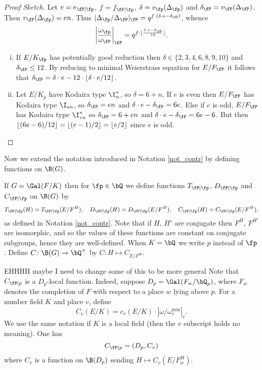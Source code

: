 \begin{proof}[Proof Sketch]
    Let $e = e_{\fP \mid \fp}$, $f = f_{\fP \mid \fp}$, $\delta = v_{\fp}(\Delta_{\fp})$ and $\delta_{\fP} = v_{\fP}(\Delta_{\fP})$. Then $v_{\fP}(\Delta_{\fp}) = e n$. Thus $|\Delta_{\fp} / \Delta_{\fP} |_{\fP} = q^{f\cdot (\delta \cdot e - \delta_{\fP})}$, whence $$\left| \frac{\omega_{\fp}}{\omega_{\fP}}\right|_{\fP} = q^{f \cdot \floor{\frac{\delta \cdot e - \delta_{\fP}}{12}}}.$$ 
    \begin{enumerate}[(i)]
        \setlength\itemsep{0em}
        \setcounter{enumi}{1}
        \item If $E / K_{\fp}$ has potentially good reduction then $\delta \in \{ 2,3,4,6,8,9,10 \}$ and $\delta_{\fP} \leq 12$. By reducing to minimal Weierstrass equation for $E / F_{\fP}$ it follows that $\delta_{\fP} = \delta\cdot e - 12 \cdot \floor{\delta\cdot e / 12}$.
        
        \item Let $E / K_p$ have Kodaira type $\I_n^*$, so $\delta = 6 + n$. If $e$ is even then $E / F_{\fP}$ has Kodaira type $\I_{en}$, so $\delta_{\fP} = en$ and $\delta \cdot e - \delta_{\fP} = 6 e$.
        Else if $e$ is odd, $E / F_{\fP}$ has Kodaira type $\I_{en}^*$ so $\delta_{\fP} = 6 + en$ and $\delta\cdot e - \delta_{\fP} = 6 e - 6$. But then $\lfloor(6e - 6)/12\rfloor = \lfloor(e - 1)/2\rfloor = \lfloor e / 2\rfloor$ since $e$ is odd.
    \end{enumerate}
\end{proof}

Now we extend the notation introduced in Notation \ref{not_contr} by defining functions on $\B(G)$. 

\begin{defn}\label{not_contr_fns}
    If $G = \Gal(F / K)$ then for $\fp \in \bQ$ we define functions $T_{\fP \mid \fp}$, $D_{\fP \mid \fp}$ and $C_{\fP \mid \fp}$ on $\B(G)$ by 
    \[ T_{\fP \mid \fp}(H) = T_{\fP \mid \fp}(E / F^H), \quad D_{\fP \mid \fp}(H) = D_{\fP \mid \fp}(E / F^H), \quad C_{\fP \mid \fp}(H) = C_{\fP \mid \fp}(E / F^H), \]
    as defined in Notation \ref{not_contr}.
    Note that if $H$, $H'$ are conjugate then $F^H$, $F^{H'}$ are isomorphic, and so the values of these functions are constant on conjugate subgroups, hence they are well-defined. When $K = \bQ$ we write $p$ instead of $\fp$. Define $C \colon \B(G) \to \bQ^{\times}$ by $C \colon H \mapsto C_{E / F^H}$.  
\end{defn}
 
{\color{red} EHHHH maybe I need to change some of this to be more general}
Note that $C_{\fP \mid p}$ is a $D_p$-local function. Indeed, suppose $D_p = \Gal(F_w / \bQ_p)$, where $F_w$ denotes the completion of $F$ with respect to a place $w$ lying above $p$. For a number field $K$ and place $v$, define $$C_v(E / K) = c_v(E / K) \cdot \left| \omega / \omega_v^{\min} \right|_v.$$ We use the same notation if $K$ is a local field (then the $v$ subscript holds no meaning).
One has
\begin{equation*}
    C_{\fP \mid p} = (D_p, C_v)
\end{equation*}
where $C_v$ is a function on $\B(D_p)$ sending $H \mapsto C_v(E / F_w^H)$.

